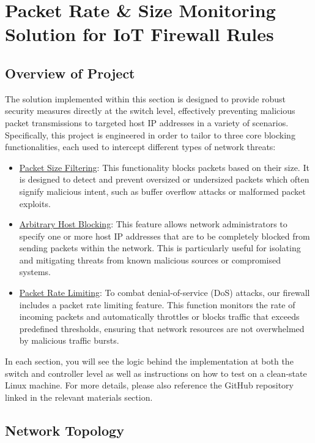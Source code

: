\section{Packet Rate \& Size Monitoring Solution for IoT Firewall Rules}
\subsection{Overview of Project}
The solution implemented within this section is designed to provide robust security measures directly at the switch level, effectively preventing malicious packet transmissions to targeted host IP addresses in a variety of scenarios. Specifically, this project is engineered in order to tailor to three core blocking functionalities, each used to intercept different types of network threats:
\begin{itemize}
    \item \underline{Packet Size Filtering}: This functionality blocks packets based on their size. It is designed to detect and prevent oversized or undersized packets which often signify malicious intent, such as buffer overflow attacks or malformed packet exploits.
    \item \underline{Arbitrary Host Blocking}: This feature allows network administrators to specify one or more host IP addresses that are to be completely blocked from sending packets within the network. This is particularly useful for isolating and mitigating threats from known malicious sources or compromised systems.
    \item \underline{Packet Rate Limiting}: To combat denial-of-service (DoS) attacks, our firewall includes a packet rate limiting feature. This function monitors the rate of incoming packets and automatically throttles or blocks traffic that exceeds predefined thresholds, ensuring that network resources are not overwhelmed by malicious traffic bursts.
\end{itemize}
In each section, you will see the logic behind the implementation at both the switch and controller level as well as instructions on how to test on a clean-state Linux machine. For more details, please also reference the GitHub repository linked in the relevant materials section. 
\subsection{Network Topology}
